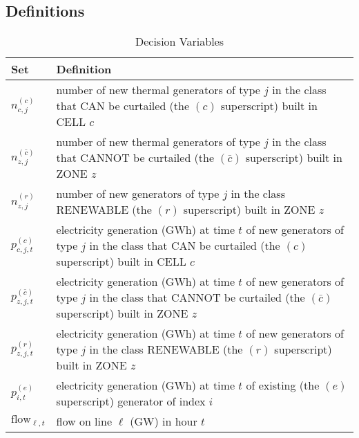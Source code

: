 \documentclass[11pt, oneside]{article}   	%
\newcommand{\flow}{\text{flow}}
\newcommand{\bc}{\bar{c}}
\begin{document}
\subsection{Definitions}

\begin{table}[H]
   \centering
   \caption{Decision Variables}
   \begin{tabular}{p{1in} p{4in} } %
      \toprule
      \textbf{Set} & \textbf{Definition} \\
      \midrule
      $n^{(c)}_{c, j}$ & number of new thermal generators of type $j$ in the class that CAN be curtailed (the $(c)$ superscript) built in CELL $c$\\
      $n^{(\bc)}_{z, j}$ & number of new thermal generators of type $j$ in the class that CANNOT be curtailed (the $(\bc)$ superscript) built in ZONE $z$\\
      $n^{(r)}_{z, j}$ & number of new generators of type $j$ in the class RENEWABLE (the $(r)$ superscript) built in ZONE $z$\\
      $p^{(c)}_{c, j, t}$ & electricity generation (GWh) at time $t$ of new generators  of type $j$ in the  class that CAN be curtailed (the $(c)$ superscript) built in CELL $c$\\
      $p^{(\bc)}_{z, j, t}$ & electricity generation (GWh) at time $t$ of new generators of type $j$ in the class that CANNOT be curtailed (the $(\bc)$ superscript) built in ZONE $z$\\
      $p^{(r)}_{z, j, t}$ & electricity generation (GWh) at time $t$ of new generators  of type $j$ in the class RENEWABLE (the $(r)$ superscript) built in ZONE $z$\\
      $p^{(e)}_{i, t}$ & electricity generation (GWh) at time $t$ of existing (the $(e)$ superscript) generator of index $i$ \\
      $\flow_{\ell, t}$ & flow on line $\ell$ (GW) in hour $t$\\
%
      \bottomrule
   \end{tabular}
   \label{tab:decision}
\end{table}
\end{document}
